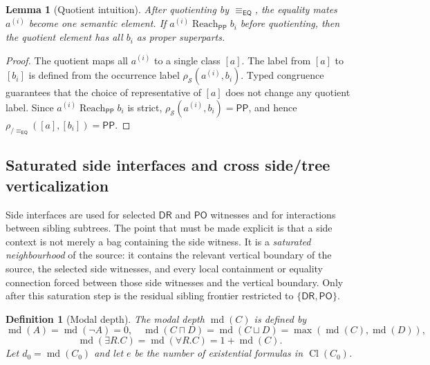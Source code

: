 \documentclass[11pt]{article}
\newtheorem{lemma}[theorem]{Lemma}
\newtheorem{definition}[theorem]{Definition}
\newcommand{\EQ}{\mathsf{EQ}}
\newcommand{\DR}{\mathsf{DR}}
\newcommand{\PO}{\mathsf{PO}}
\newcommand{\PP}{\mathsf{PP}}
\newcommand{\Cl}{\operatorname{Cl}}
\newcommand{\md}{\operatorname{md}}
\newcommand{\eqc}{\equiv_{\EQ}}
\newcommand{\reach}{\operatorname{Reach}}
\begin{document}
\begin{lemma}[Quotient intuition]\label{lem:split-copy-intuition}
After quotienting by $\eqc$, the equality mates $a^{(i)}$ become one semantic element.  If $a^{(i)}\reach_\PP b_i$ before quotienting, then the quotient element has all $b_i$ as proper superparts.
\end{lemma}

\begin{proof}
The quotient maps all $a^{(i)}$ to a single class $[a]$.  The label from $[a]$ to $[b_i]$ is defined from the occurrence label $\rho_\mathcal S(a^{(i)},b_i)$.  Typed congruence guarantees that the choice of representative of $[a]$ does not change any quotient label.  Since $a^{(i)}\reach_\PP b_i$ is strict, $\rho_\mathcal S(a^{(i)},b_i)=\PP$, and hence $\rho_{/\eqc}([a],[b_i])=\PP$.
\end{proof}


\subsection{Saturated side interfaces and cross side/tree verticalization}\label{subsec:saturated-side}

Side interfaces are used for selected $\DR$ and $\PO$ witnesses and for interactions between sibling subtrees.  The point that must be made explicit is that a side context is not merely a bag containing the side witness.  It is a \emph{saturated neighbourhood} of the source: it contains the relevant vertical boundary of the source, the selected side witnesses, and every local containment or equality connection forced between those side witnesses and the vertical boundary.  Only after this saturation step is the residual sibling frontier restricted to $\{\DR,\PO\}$.

\begin{definition}[Modal depth]
The modal depth $\md(C)$ is defined by
\[
\md(A)=\md(\neg A)=0,
\quad
\md(C\sqcap D)=\md(C\sqcup D)=\max(\md(C),\md(D)),
\]
\[
\md(\exists R.C)=\md(\forall R.C)=1+\md(C).
\]
Let $d_0=\md(C_0)$ and let $e$ be the number of existential formulas in $\Cl(C_0)$.
\end{definition}
\end{document}
